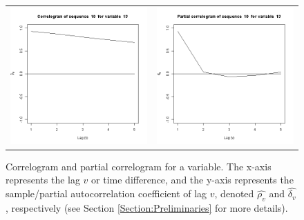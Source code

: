 \begin{figure}[htbp]
  \centering
   \begin{tabular}{cc}    
       \includegraphics[width=70mm]{figures/CajamarCorrelogram} &
        \includegraphics[width=70mm]{figures/CajamarPartialCorrelogram}
    \end{tabular}
     \caption{\label{fig:CajamarCorrelogramsAndPartial} Correlogram and partial correlogram for a variable. The x-axis represents the lag $v$ or time difference, and the y-axis represents the sample/partial autocorrelation coefficient of lag $v$, denoted $\hat{\rho_v}$ and $\hat{\delta_v}$, respectively (see Section \ref{Section:Preliminaries} for more details).}
\end{figure}

